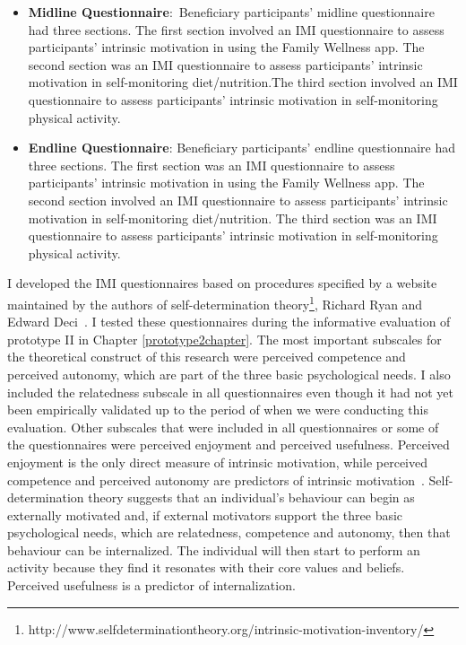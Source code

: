 \begin{enumerate}
\begin{itemize}
\item{\textbf{Midline Questionnaire}}:~Beneficiary participants' midline questionnaire had three sections. The first section involved an IMI questionnaire  to assess participants' intrinsic motivation in using the Family Wellness app. The second section was an IMI questionnaire to assess participants' intrinsic motivation in self-monitoring diet/nutrition.The third section involved an IMI questionnaire to assess participants' intrinsic motivation in self-monitoring physical activity.

\item{\textbf{Endline Questionnaire}}: Beneficiary participants' endline questionnaire had three sections. The first section was an IMI questionnaire  to assess participants' intrinsic motivation in using the Family Wellness app. The second section involved an IMI questionnaire to assess participants' intrinsic motivation in self-monitoring diet/nutrition. The third section was an IMI questionnaire to assess participants' intrinsic motivation in self-monitoring physical activity.
\end{itemize}
\end{enumerate}

I developed the IMI questionnaires based on procedures specified by a website maintained by the authors of self-determination theory\footnote{http://www.selfdeterminationtheory.org/intrinsic-motivation-inventory/}, Richard Ryan and Edward Deci~\citep{deci1985intrinsic}. I tested these questionnaires during the informative evaluation of prototype II in Chapter \ref{prototype2chapter}. The most important subscales for the theoretical construct of this research were perceived competence and perceived autonomy, which are part of the three basic psychological needs. I also included the relatedness subscale in all questionnaires even though it had not yet been empirically validated up to the period of when we were conducting this evaluation. Other subscales that were included in all questionnaires or some of the questionnaires were perceived enjoyment and perceived usefulness. Perceived enjoyment is the only direct measure of intrinsic motivation, while perceived competence and perceived autonomy are predictors of intrinsic motivation~\citep{sdtweb}. Self-determination theory suggests that an individual's behaviour can begin as externally motivated and, if external motivators support the three basic psychological needs, which are relatedness, competence and autonomy, then that behaviour can be internalized. The individual will then start to perform an activity because they find it resonates with their core values and beliefs. Perceived usefulness is a predictor of internalization.

